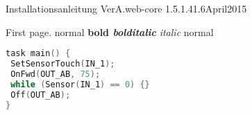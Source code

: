\documentclass{tarentanleitung}
\begin{document}
\tarentanleitung
 {Installationsanleitung VerA.web-core}
 {1.5.1.4}{1.6}{April}{2015}

First page. normal \textbf{bold \textit{bolditalic}} \textit{italic} normal

\begin{lstlisting}[language=c]
task main() {
 SetSensorTouch(IN_1);
 OnFwd(OUT_AB, 75);
 while (Sensor(IN_1) == 0) {}
 Off(OUT_AB);
}
\end{lstlisting}

\newpage
\layout{}
\end{document}
